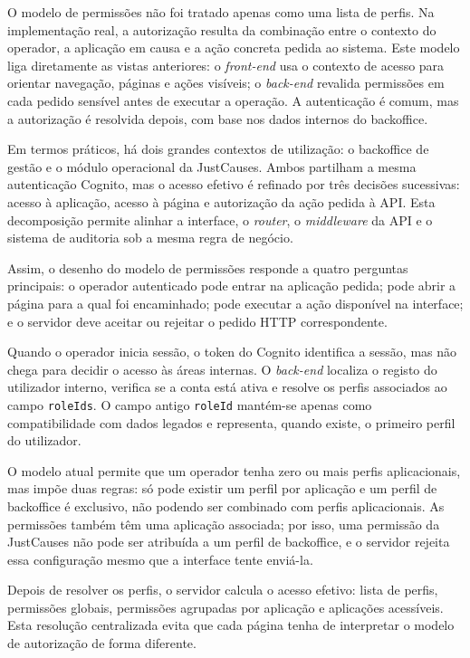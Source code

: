 O modelo de permissões não foi tratado apenas como uma lista de perfis. Na implementação real, a autorização resulta da combinação entre o contexto do operador, a aplicação em causa e a ação concreta pedida ao sistema. Este modelo liga diretamente as vistas anteriores: o \textit{front-end} usa o contexto de acesso para orientar navegação, páginas e ações visíveis; o \textit{back-end} revalida permissões em cada pedido sensível antes de executar a operação. A autenticação é comum, mas a autorização é resolvida depois, com base nos dados internos do backoffice.

Em termos práticos, há dois grandes contextos de utilização: o backoffice de gestão e o módulo operacional da JustCauses. Ambos partilham a mesma autenticação Cognito, mas o acesso efetivo é refinado por três decisões sucessivas: acesso à aplicação, acesso à página e autorização da ação pedida à \gls{API}. Esta decomposição permite alinhar a interface, o \textit{router}, o \textit{middleware} da \gls{API} e o sistema de auditoria sob a mesma regra de negócio.

Assim, o desenho do modelo de permissões responde a quatro perguntas principais: o operador autenticado pode entrar na aplicação pedida; pode abrir a página para a qual foi encaminhado; pode executar a ação disponível na interface; e o servidor deve aceitar ou rejeitar o pedido \gls{HTTP} correspondente.

Quando o operador inicia sessão, o token do Cognito identifica a sessão, mas não chega para decidir o acesso às áreas internas. O \textit{back-end} localiza o registo do utilizador interno, verifica se a conta está ativa e resolve os perfis associados ao campo \texttt{roleIds}. O campo antigo \texttt{roleId} mantém-se apenas como compatibilidade com dados legados e representa, quando existe, o primeiro perfil do utilizador.

O modelo atual permite que um operador tenha zero ou mais perfis aplicacionais, mas impõe duas regras: só pode existir um perfil por aplicação e um perfil de backoffice é exclusivo, não podendo ser combinado com perfis aplicacionais. As permissões também têm uma aplicação associada; por isso, uma permissão da JustCauses não pode ser atribuída a um perfil de backoffice, e o servidor rejeita essa configuração mesmo que a interface tente enviá-la.

Depois de resolver os perfis, o servidor calcula o acesso efetivo: lista de perfis, permissões globais, permissões agrupadas por aplicação e aplicações acessíveis. Esta resolução centralizada evita que cada página tenha de interpretar o modelo de autorização de forma diferente.

